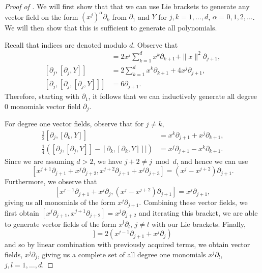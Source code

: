 \documentclass[10pt,a4paper]{amsart}
\begin{document}
\begin{proof}[Proof of ]
We will first show that that we can use Lie brackets to generate any vector field on the form $(x^j)^\alpha \partial_k$ from $\partial_1$ and $Y$ for $j,k =1, \dots, d$, $\alpha = 0,1, 2, \dots$. We will then show that this is sufficient to generate all polynomials.

Recall that indices are denoted modulo $d$. Observe that
\begin{align}
[\partial_j, Y] &= 2 x^j \sum_{k=1}^d x^k \partial_{k+1} + \|x\|^2 \partial_{j+1}, \\
[\partial_j, [\partial_j, Y]] &= 2 \sum_{k=1}^d x^k \partial_{k+1} + 4 x^j \partial_{j+1}  ,\\
[\partial_j, [\partial_j, [\partial_j, Y]]] &= 6\partial_{j+1}.
\end{align}
Therefore, starting with $\partial_1$, it follows that we can inductively generate all degree 0 monomials vector field $\partial_j$.

For degree one vector fields, observe that for $j \neq k$,
\begin{align}
\frac{1}{2} [\partial_j, [\partial_k, Y]] &=  x^k  \partial_{j+1} + x^j \partial_{k+1} ,\\
\frac{1}{4}([\partial_j, [\partial_j, Y]]-[\partial_k, [\partial_{k}, Y]]]) &=  x^j \partial_{j+1} - x^k \partial_{k+1}.
\end{align}
Since we are assuming $d >2$, we have $j+2 \neq j \bmod d$, and hence we can use
$$[x^{j+1} \partial_{j+1} + x^j \partial_{j+2}, x^{j+2} \partial_{j+1} + x^{j} \partial_{j+3}]  = (x^j  - x^{j+2}) \partial_{j+1}.$$
Furthermore, we observe that
$$[x^{j-1} \partial_{j+1} + x^j \partial_j, (x^j - x^{j+2}) \partial_{j+1}] = x^j \partial_{j+1},$$
giving us all monomials of the form $x^j\partial_{j+1}$. Combining these vector fields, we first obtain $[x^{j} \partial_{j+1}, x^{j+1} \partial_{j+2}] = x^j \partial_{j+2}$ and iterating this bracket, we are able to generate vector fields of the form $x^l \partial_{l}$, $j \neq l$ with our Lie brackets. Finally,
\begin{equation}
[\partial_{j-1}, [\partial_j, Y]] = 2(x^{j-1}\partial_{j+1} + x^j\partial_j)
\end{equation}
and so by linear combination with previously acquired terms, we obtain vector fields, $x^j \partial_{j}$, giving us a complete set of all degree one monomials $x^j\partial_l$, $j,l=1,\dots, d$.


\end{proof}
\end{document}
